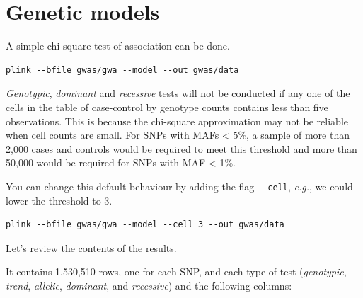 \documentclass[
]{book}
\newcommand{\passthrough}[1]{#1}
\begin{document}
\hypertarget{genetic-models}{%
\section{Genetic models}\label{genetic-models}}

A simple chi-square test of association can be done.

\begin{lstlisting}
plink --bfile gwas/gwa --model --out gwas/data
\end{lstlisting}

\emph{Genotypic}, \emph{dominant} and \emph{recessive} tests will not be conducted if any one of the cells in the table of case-control by genotype counts contains less than five observations. This is because the chi-square approximation may not be reliable when cell counts are small. For SNPs with MAFs \textless{} 5\%, a sample of more than 2,000 cases and controls would be required to meet this threshold and more than 50,000 would be required for SNPs with MAF \textless{} 1\%.

You can change this default behaviour by adding the flag \passthrough{\lstinline!--cell!}, \emph{e.g.}, we could lower the threshold to 3.

\begin{lstlisting}
plink --bfile gwas/gwa --model --cell 3 --out gwas/data
\end{lstlisting}

Let's review the contents of the results.

It contains 1,530,510 rows, one for each SNP, and each type of test (\emph{genotypic}, \emph{trend}, \emph{allelic}, \emph{dominant}, and \emph{recessive}) and the following columns:
\end{document}

